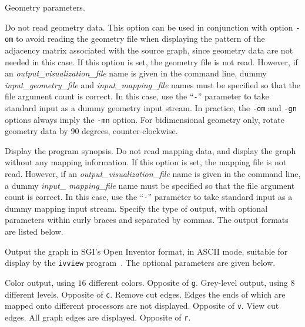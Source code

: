 \begin{itemize}
\progopt
\begin{itemize}
Geometry parameters.
\begin{itemize}
\iteme[\texttt{n}]
Do not read geometry data. This option can be used in conjunction with
option \texttt{-om} to avoid reading the geometry file when displaying
the pattern of the adjacency matrix associated with the source graph,
since geometry data are not needed in this case.
If this option is set, the geometry file is not read. However, if an
{\it output\_\lbt visualization\_\lbt file} name is given in the
command line, dummy {\it input\_\lbt geometry\_\lbt file\/} and {\it
input\_\lbt mapping\_\lbt file\/} names must be specified so that the
file argument count is correct. In this case, use the ``\texttt{-}''
parameter to take standard input as a dummy geometry input stream.  In
practice, the \texttt{-om} and \texttt{-gn} options always imply the
\texttt{-mn} option.
\iteme[\texttt{r}]
For bidimensional geometry only, rotate geometry data by $90$ degrees,
counter-clockwise.
\end{itemize}
\iteme[\texttt{-h}]
Display the program synopsis.
\iteme[\texttt{-mn}]
Do not read mapping data, and display the graph without any mapping
information. If this option is set, the mapping file is not
read. However, if an {\it output\_\lbt visualization\_\lbt file\/}
name is given in the command line, a dummy {\it input\_\lbt
mapping\_\lbt file\/} name must be specified so that the file argument
count is correct. In this case, use the ``\texttt{-}'' parameter to take
standard input as a dummy mapping input stream.
Specify the type of output, with optional parameters within curly braces
and separated by commas. The output formats are listed below.
\begin{itemize}
\iteme[\texttt{i}]
Output the graph in SGI's {\sc Open Inventor} format, in ASCII mode,
suitable for display by the \texttt{ivview} program~\cite{oinv}. The
optional parameters are given below.
\begin{itemize}
\iteme[\texttt{c}]
Color output, using $16$ different colors. Opposite of \texttt{g}.
\iteme[\texttt{g}]
Grey-level output, using $8$ different levels. Opposite of \texttt{c}.
\iteme[\texttt{r}]
Remove cut edges. Edges the ends of which are mapped onto different
processors are not displayed. Opposite of \texttt{v}.
\iteme[\texttt{v}]
View cut edges. All graph edges are displayed.
Opposite of \texttt{r}.
\end{itemize}

\end{itemize}
\end{itemize}
\end{itemize}
